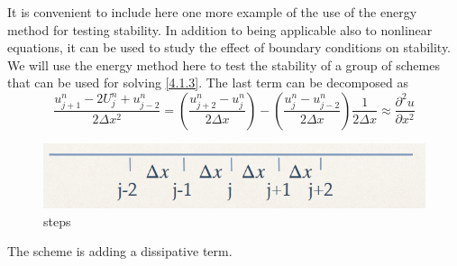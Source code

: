 It is convenient to include here one more example of the use of the energy method for testing stability. In addition to being applicable also to nonlinear equations, it can be used to study the effect of boundary conditions on stability. We will use the energy method here to test the stability of a group of schemes that can be used for solving \ref{4.1.3}.
The last term can be decomposed as
\begin{equation}
	\frac{u_{j+1}^n-2U_j^n+u_{j-2}^n}{2\Delta x^2}=\left(\frac{u^n_{j+2}-u^n_j}{2\Delta x}\right)-\left(\frac{u_j^n-u^n_{j-2}}{2\Delta x}\right)\frac{1}{2\Delta x}\approx \frac{\partial^2u}{\partial x^2}
\end{equation}
\begin{figure}[h]
	\centering
	\includegraphics[width=0.5\linewidth]{uploads/Screenshot 2024-11-12 151817.png}
	\caption{steps}
	\label{fig:step}
\end{figure}
The scheme is adding a dissipative term.
